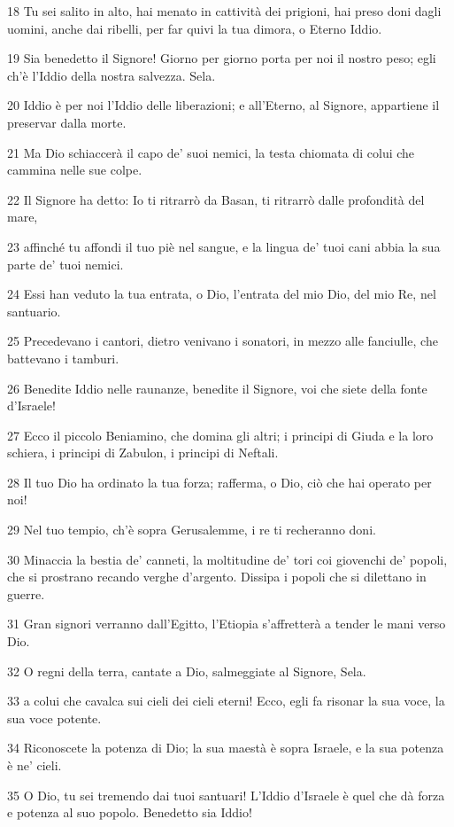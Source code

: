 \par 18 Tu sei salito in alto, hai menato in cattività dei prigioni, hai preso doni dagli uomini, anche dai ribelli, per far quivi la tua dimora, o Eterno Iddio.
\par 19 Sia benedetto il Signore! Giorno per giorno porta per noi il nostro peso; egli ch'è l'Iddio della nostra salvezza. Sela.
\par 20 Iddio è per noi l'Iddio delle liberazioni; e all'Eterno, al Signore, appartiene il preservar dalla morte.
\par 21 Ma Dio schiaccerà il capo de' suoi nemici, la testa chiomata di colui che cammina nelle sue colpe.
\par 22 Il Signore ha detto: Io ti ritrarrò da Basan, ti ritrarrò dalle profondità del mare,
\par 23 affinché tu affondi il tuo piè nel sangue, e la lingua de' tuoi cani abbia la sua parte de' tuoi nemici.
\par 24 Essi han veduto la tua entrata, o Dio, l'entrata del mio Dio, del mio Re, nel santuario.
\par 25 Precedevano i cantori, dietro venivano i sonatori, in mezzo alle fanciulle, che battevano i tamburi.
\par 26 Benedite Iddio nelle raunanze, benedite il Signore, voi che siete della fonte d'Israele!
\par 27 Ecco il piccolo Beniamino, che domina gli altri; i principi di Giuda e la loro schiera, i principi di Zabulon, i principi di Neftali.
\par 28 Il tuo Dio ha ordinato la tua forza; rafferma, o Dio, ciò che hai operato per noi!
\par 29 Nel tuo tempio, ch'è sopra Gerusalemme, i re ti recheranno doni.
\par 30 Minaccia la bestia de' canneti, la moltitudine de' tori coi giovenchi de' popoli, che si prostrano recando verghe d'argento. Dissipa i popoli che si dilettano in guerre.
\par 31 Gran signori verranno dall'Egitto, l'Etiopia s'affretterà a tender le mani verso Dio.
\par 32 O regni della terra, cantate a Dio, salmeggiate al Signore, Sela.
\par 33 a colui che cavalca sui cieli dei cieli eterni! Ecco, egli fa risonar la sua voce, la sua voce potente.
\par 34 Riconoscete la potenza di Dio; la sua maestà è sopra Israele, e la sua potenza è ne' cieli.
\par 35 O Dio, tu sei tremendo dai tuoi santuari! L'Iddio d'Israele è quel che dà forza e potenza al suo popolo. Benedetto sia Iddio!

